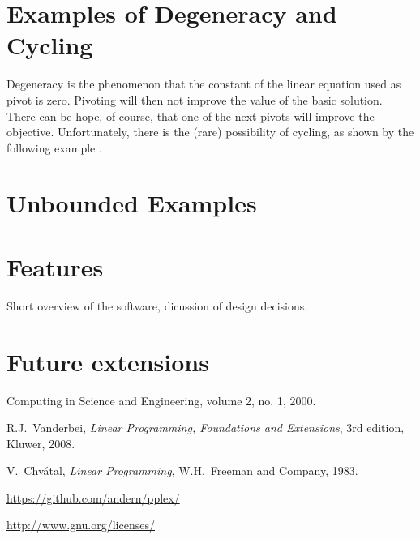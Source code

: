 \documentclass[ukenglish]{nik}
\begin{document}
\section{Examples of Degeneracy and Cycling}\label{sec:cycling}
Degeneracy is the phenomenon that the constant of the linear equation used as pivot
is zero. Pivoting will then not improve the value of the basic solution. 
There can be hope, of course, that one of the next pivots will improve
the objective. Unfortunately, there is the (rare) possibility of cycling,
as shown by the following example \cite{Chvatal,Vanderbei}.

\begin{alltt}

\end{alltt}

\section{Unbounded Examples}\label{sec:unbounded}




\section{Features}\label{sec:features}
Short overview of the software, dicussion of design decisions.

\section{Future extensions}\label{sec:future}





\begin{thebibliography}{99}
 Computing in Science and Engineering, volume 2, no. 1, 2000.

 R.J.~Vanderbei, 
\emph{Linear Programming, Foundations and Extensions},
3rd edition, Kluwer, 2008.

 V.~Chv\'atal,
\emph{Linear Programming},
W.H.~Freeman and Company, 1983.

\url{https://github.com/andern/pplex/}

\url{http://www.gnu.org/licenses/}

\end{thebibliography}
\end{document}

